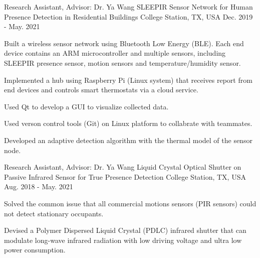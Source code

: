 

\begin{cventries}

  \cventry
    {Research Assistant, Advisor: Dr. Ya Wang} %
    {SLEEPIR Sensor Network for Human Presence Detection in Residential Buildings} %
    {College Station, TX, USA} %
    {Dec. 2019 - May. 2021} %
    {
      \begin{cvitems} %
        \item Built a wireless sensor network using Bluetooth Low Energy (BLE). Each end device contains an ARM microcontroller and multiple sensors, including SLEEPIR presence sensor, motion sensors and temperature/humidity sensor.
        \item Implemented a hub using Raspberry Pi (Linux system) that receives report from end devices and controls smart thermostats via a cloud service.
        \item Used Qt to develop a GUI to visualize collected data.
        \item Used verson control tools (Git) on Linux platform to collabrate with teammates.
        \item Developed an adaptive detection algorithm with the thermal model of the sensor node.
      \end{cvitems}
    }
  \cventry
    {Research Assistant, Advisor: Dr. Ya Wang} %
    {Liquid Crystal Optical Shutter on Passive Infrared Sensor for True Presence Detection} %
    {College Station, TX, USA} %
    {Aug. 2018 - May. 2021} %
    {
      \begin{cvitems} %
        \item Solved the common issue that all commercial motions sensors (PIR sensors) could not detect stationary occupants.
        \item Devised a Polymer Dispersed Liquid Crystal (PDLC) infrared shutter that can modulate long-wave infrared radiation with low driving voltage and ultra low power consumption.

\end{cvitems}}
\end{cventries}
